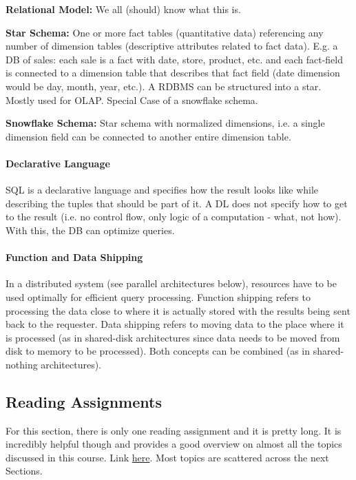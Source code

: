 \textbf{Relational Model:} We all (should) know what this is.

\textbf{Star Schema:} One or more fact tables (quantitative data) referencing any number of dimension tables (descriptive attributes related to fact data). E.g. a DB of sales: each sale is a fact with date, store, product, etc. and each fact-field is connected to a dimension table that describes that fact field (date dimension would be day, month, year, etc.). A RDBMS can be structured into a star. Mostly used for OLAP. Special Case of a snowflake schema.

\textbf{Snowflake Schema:} Star schema with normalized dimensions, i.e. a single dimension field can be connected to another entire dimension table.

\paragraph{Declarative Language}
SQL is a declarative language and specifies how the result looks like while describing the tuples that should be part of it. A DL does not specify how to get to the result (i.e. no control flow, only logic of a computation - what, not how). With this, the DB can optimize queries.

\paragraph{Function and Data Shipping}
In a distributed system (see parallel architectures below), resources have to be used optimally for efficient query processing. Function shipping refers to processing the data close to where it is actually stored with the results being sent back to the requester. Data shipping refers to moving data to the place where it is processed (as in shared-disk architectures since data needs to be moved from disk to memory to be processed). Both concepts can be combined (as in shared-nothing architectures).


\subsection{Reading Assignments}

For this section, there is only one reading assignment and it is pretty long. It is incredibly helpful though and provides a good overview on almost all the topics discussed in this course. Link \href{https://dsf.berkeley.edu/papers/fntdb07-architecture.pdf}{here}. Most topics are scattered across the next Sections.


